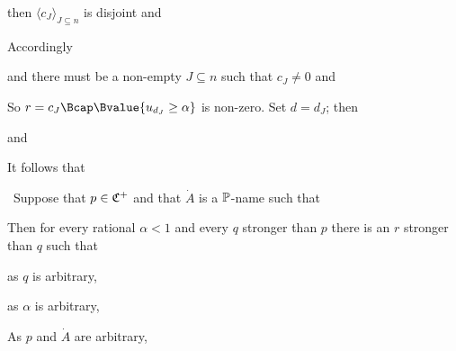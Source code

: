 {

\noindent then $\langle c_J\rangle_{J\subseteq n}$ is disjoint and


\noindent Accordingly


\noindent and there must be a non-empty $J\subseteq n$ such that
$c_J\ne 0$ and


\noindent So $r=c_J\Bcap\Bvalue{u_{d_J}\ge\alpha}$ is non-zero.
Set $d=d_J$;  then


\noindent and


\medskip

 It follows that


\noindent\Prf\ Suppose that $p\in\frak C^+$ and that $\dot A$ is a
$\Bbb P$-name such that


\noindent Then for every rational $\alpha<1$ and every $q$ stronger than
$p$ there is an $r$ stronger than $q$ such that


\noindent as $q$ is arbitrary,


\noindent as $\alpha$ is arbitrary,


\noindent As $p$ and $\dot A$ are arbitrary,


}
